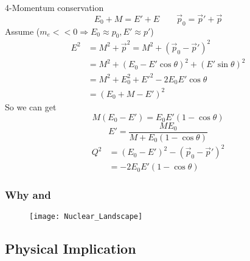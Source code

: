 4-Momentum conservation 
$$ E_0 + M = E' + E \qquad \vec{p}_0 = \vec{p}' + \vec{p} $$
Assume ($m_e << 0 \Rightarrow E_0 \approx p_0, E' \approx p'$)
\begin{equation*}
    \begin{aligned}
	E^2 &= M^2 + \vec{p}^2 = M^2 + (\vec{p}_0 - \vec{p}')^2  \\
	    &= M^2 + (E_0 - E'\cos\theta)^2 + (E'\sin\theta)^2	\\
	    &= M^2 + E_0^2 + E'^2 - 2E_0E'\cos\theta	\\
	    &= (E_0 + M - E')^2
    \end{aligned}
\end{equation*}
So we can get
$$ M(E_0 - E') = E_0E'(1-\cos\theta) $$
$$ E' = \frac{ME_0}{M + E_0(1-\cos\theta)}$$
\begin{equation*}
    \begin{aligned}
	Q^2 &= (E_0 - E')^2 - (\vec{p}_0 - \vec{p}')^2	\\
	    &= -2E_0E'(1-\cos\theta)
    \end{aligned}
\end{equation*}

\subsubsection{Why \Pb and \Ca}
\begin{figure}
    \texttt{[image: Nuclear\_Landscape]}
\end{figure}

\subsection{Physical Implication}
